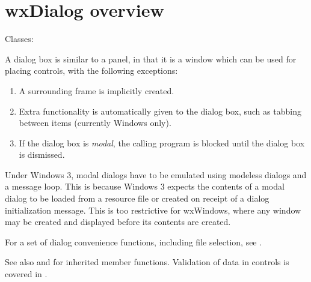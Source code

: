 \section{wxDialog overview}\label{wxdialogoverview}

Classes: 

A dialog box is similar to a panel, in that it is a window which can
be used for placing controls, with the following exceptions:

\begin{enumerate}
\item A surrounding frame is implicitly created.
\item Extra functionality is automatically given to the dialog box,
  such as tabbing between items (currently Windows only).
\item If the dialog box is {\it modal}, the calling program is blocked
  until the dialog box is dismissed.
\end{enumerate}

Under Windows 3, modal dialogs have to be emulated using
modeless dialogs and a message loop. This is because Windows 3 expects
the contents of a modal dialog to be loaded from a resource file or
created on receipt of a dialog initialization message. This is too
restrictive for wxWindows, where any window may be created and displayed
before its contents are created.

For a set of dialog convenience functions, including file selection, see
\rtfsp{}.

See also  and  for inherited
member functions. Validation of data in controls is covered
in .



